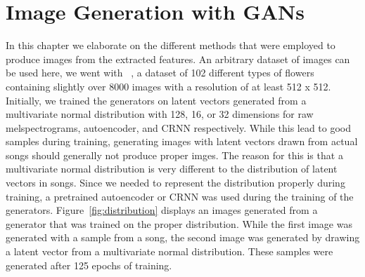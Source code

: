 \chapter{Image Generation with GANs}\label{ch:generation}

    In this chapter we elaborate on the different methods that were employed to produce images from the extracted features. An arbitrary dataset of images can be used here, we went with ~\cite{102flower}, a dataset of 102 different types of flowers containing slightly over 8000 images with a resolution of at least 512 x 512.\\
    Initially, we trained the generators on latent vectors generated from a multivariate normal distribution with 128, 16, or 32 dimensions for raw melspectrograms, autoencoder, and CRNN respectively. While this lead to good samples during training, generating images with latent vectors drawn from actual songs should generally not produce proper imges. The reason for this is that a multivariate normal distribution is very different to the distribution of latent vectors in songs. Since we needed to represent the distribution properly during training, a pretrained autoencoder or CRNN was used during the training of the generators. Figure~\ref{fig:distribution} displays an images generated from a generator that was trained on the proper distribution. While the first image was generated with a sample from a song, the second image was generated by drawing a latent vector from a multivariate normal distribution. These samples were generated after 125 epochs of training.

